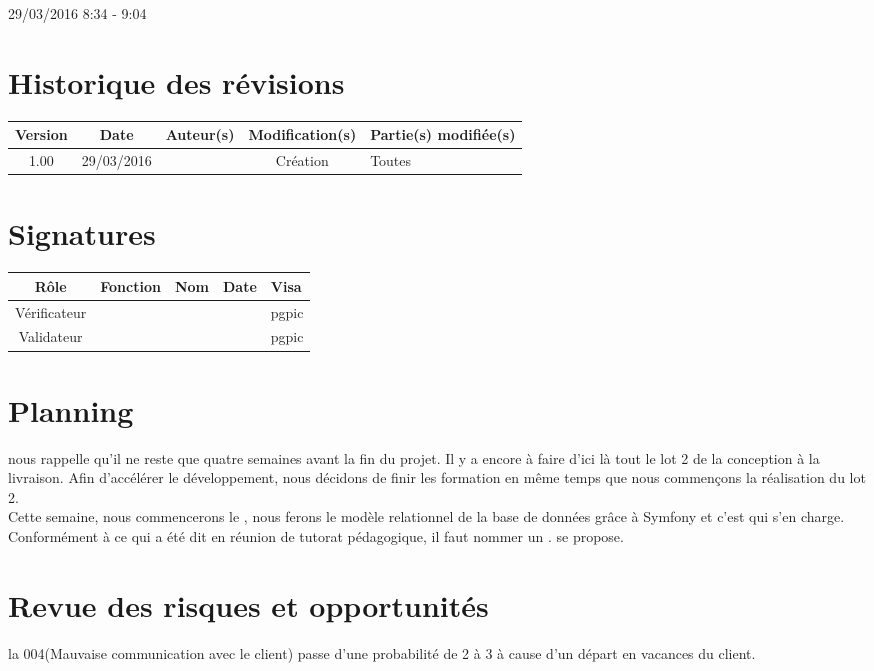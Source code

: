 \documentclass [a4paper] {article}
\begin{document}
29/03/2016			 				%
\hfill   
\hfill 	 8:34 - 9:04 				%



\section*{Historique des révisions}
\begin{center}
			\begin{tabular}{| c | c | c | c | p{4cm} |}
				\hline
				\rowcolor{Gray}
				Version & Date & Auteur(s) & Modification(s) & Partie(s) modifiée(s)		 \\
				\hline
				1.00 & 29/03/2016 & \Pierre & Création & Toutes \\
		\hline		
			\end{tabular}
		\end{center}

\section*{Signatures}

		\begin{center}
			\begin{tabular}{| c | c | c | c | p{4cm} |}
				\hline
				\rowcolor{Gray}
				Rôle & Fonction & Nom & Date & Visa		 \\
				\hline
				Vérificateur & \RQA & \Kafui &  & pgpic \\[30pt]
				\hline
				Validateur & \CP & \Sergi &  & pgpic \\[30pt]	
				\hline
			\end{tabular}
		\end{center}
		
\newpage		



\section{Planning}
\Sergi{} nous rappelle qu'il ne reste que quatre semaines avant la fin du projet. Il y a encore à faire d'ici là tout le lot 2 de la conception à la livraison. Afin d’accélérer le développement, nous décidons de finir les formation en même temps que nous commençons la réalisation du lot 2. \\
Cette semaine, nous commencerons le \DCP{}, nous ferons le modèle relationnel de la base de données grâce à Symfony et c'est \Kafui{} qui s'en charge. \\
Conformément à ce qui a été dit en réunion de tutorat pédagogique, il faut nommer un \RS{}. \Florian se propose.


\section{Revue des risques et opportunités}

la \FDR{}004(Mauvaise communication avec le client) passe d'une probabilité de 2 à 3 à cause d'un départ en vacances du client.




\end{document}
